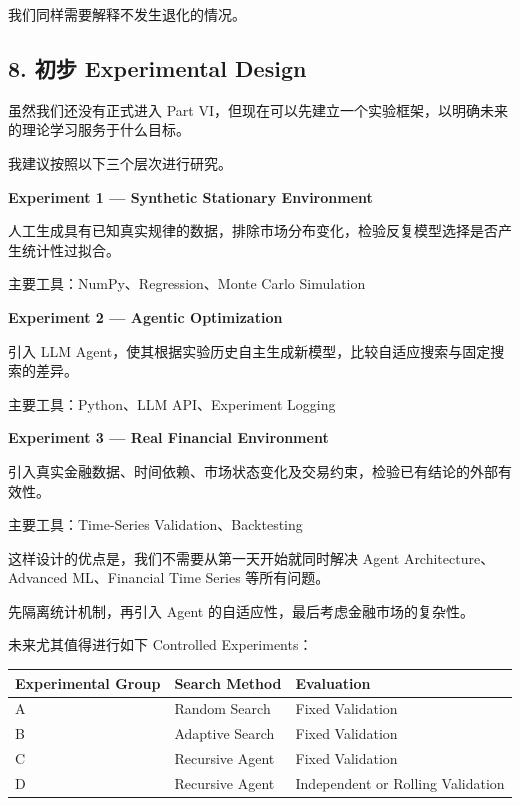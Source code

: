 我们同样需要解释不发生退化的情况。

\hypertarget{part-1-03-0001-ux521dux6b65-experimental-design}{%
\subsection{8. 初步 Experimental Design}\label{part-1-03-0001-ux521dux6b65-experimental-design}}

虽然我们还没有正式进入 Part VI，但现在可以先建立一个实验框架，以明确未来的理论学习服务于什么目标。

我建议按照以下三个层次进行研究。

\textbf{Experiment 1 --- Synthetic Stationary Environment}

人工生成具有已知真实规律的数据，排除市场分布变化，检验反复模型选择是否产生统计性过拟合。

主要工具：NumPy、Regression、Monte Carlo Simulation

\textbf{Experiment 2 --- Agentic Optimization}

引入 LLM Agent，使其根据实验历史自主生成新模型，比较自适应搜索与固定搜索的差异。

主要工具：Python、LLM API、Experiment Logging

\textbf{Experiment 3 --- Real Financial Environment}

引入真实金融数据、时间依赖、市场状态变化及交易约束，检验已有结论的外部有效性。

主要工具：Time-Series Validation、Backtesting

这样设计的优点是，我们不需要从第一天开始就同时解决 Agent Architecture、Advanced ML、Financial Time Series 等所有问题。

先隔离统计机制，再引入 Agent 的自适应性，最后考虑金融市场的复杂性。

未来尤其值得进行如下 Controlled Experiments：

\begin{readertable}
\begin{longtable}[]{@{}
  >{\raggedright\arraybackslash}p{}
  >{\raggedright\arraybackslash}p{}
  >{\raggedright\arraybackslash}p{}@{}}
\toprule
Experimental Group & Search Method & Evaluation \\
\midrule
\endhead
A & Random Search & Fixed Validation \\
B & Adaptive Search & Fixed Validation \\
C & Recursive Agent & Fixed Validation \\
D & Recursive Agent & Independent or Rolling Validation \\
\bottomrule
\end{longtable}
\end{readertable}

